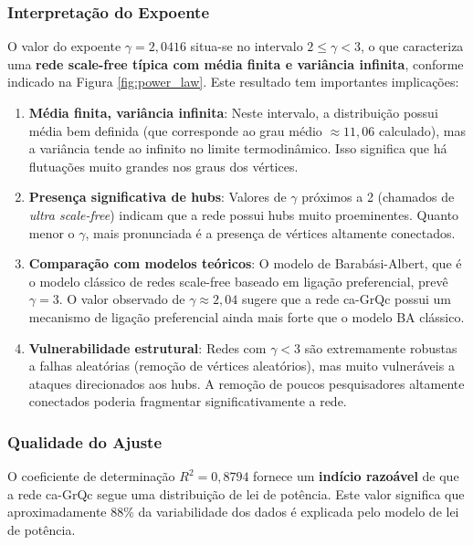\documentclass[12pt,a4paper]{article}
\begin{document}
\subsubsection{Interpretação do Expoente}

O valor do expoente $\gamma = 2,0416$ situa-se no intervalo $2 \leq \gamma < 3$, o que caracteriza uma \textbf{rede scale-free típica com média finita e variância infinita}, conforme indicado na Figura \ref{fig:power_law}. Este resultado tem importantes implicações:

\begin{enumerate}
    \item \textbf{Média finita, variância infinita}: Neste intervalo, a distribuição possui média bem definida (que corresponde ao grau médio $\approx 11,06$ calculado), mas a variância tende ao infinito no limite termodinâmico. Isso significa que há flutuações muito grandes nos graus dos vértices.
    
    \item \textbf{Presença significativa de hubs}: Valores de $\gamma$ próximos a 2 (chamados de \textit{ultra scale-free}) indicam que a rede possui hubs muito proeminentes. Quanto menor o $\gamma$, mais pronunciada é a presença de vértices altamente conectados.
    
    \item \textbf{Comparação com modelos teóricos}: O modelo de Barabási-Albert, que é o modelo clássico de redes scale-free baseado em ligação preferencial, prevê $\gamma = 3$. O valor observado de $\gamma \approx 2,04$ sugere que a rede ca-GrQc possui um mecanismo de ligação preferencial ainda mais forte que o modelo BA clássico.
    
    \item \textbf{Vulnerabilidade estrutural}: Redes com $\gamma < 3$ são extremamente robustas a falhas aleatórias (remoção de vértices aleatórios), mas muito vulneráveis a ataques direcionados aos hubs. A remoção de poucos pesquisadores altamente conectados poderia fragmentar significativamente a rede.
\end{enumerate}

\subsubsection{Qualidade do Ajuste}

O coeficiente de determinação $R^2 = 0,8794$ fornece um \textbf{indício razoável} de que a rede ca-GrQc segue uma distribuição de lei de potência. Este valor significa que aproximadamente 88\% da variabilidade dos dados é explicada pelo modelo de lei de potência.
\end{document}
